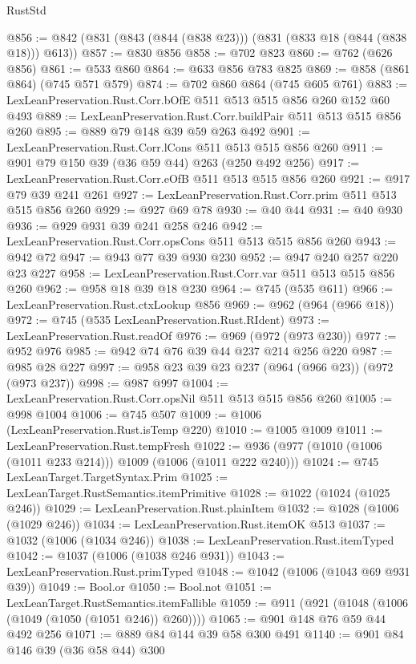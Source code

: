 \begin{lexlean}{RustStd}
\begin{coremodule}
@856 := @842 (@831 (@843 (@844 (@838 @23))) (@831 (@833 @18 (@844 (@838 @18))) @613))
@857 := @830 @856
@858 := @702 @823
@860 := @762 (@626 @856)
@861 := @533 @860
@864 := @633 @856 @783 @825
@869 := @858 (@861 @864) (@745 @571 @579)
@874 := @702 @860 @864 (@745 @605 @761)
@883 := LexLeanPreservation.Rust.Corr.bOfE @511 @513 @515 @856 @260 @152 @60 @493
@889 := LexLeanPreservation.Rust.Corr.buildPair @511 @513 @515 @856 @260
@895 := @889 @79 @148 @39 @59 @263 @492
@901 := LexLeanPreservation.Rust.Corr.lCons @511 @513 @515 @856 @260
@911 := @901 @79 @150 @39 (@36 @59 @44) @263 (@250 @492 @256)
@917 := LexLeanPreservation.Rust.Corr.eOfB @511 @513 @515 @856 @260
@921 := @917 @79 @39 @241 @261
@927 := LexLeanPreservation.Rust.Corr.prim @511 @513 @515 @856 @260
@929 := @927 @69 @78
@930 := @40 @44
@931 := @40 @930
@936 := @929 @931 @39 @241 @258 @246
@942 := LexLeanPreservation.Rust.Corr.opsCons @511 @513 @515 @856 @260
@943 := @942 @72
@947 := @943 @77 @39 @930 @230
@952 := @947 @240 @257 @220 @23 @227
@958 := LexLeanPreservation.Rust.Corr.var @511 @513 @515 @856 @260
@962 := @958 @18 @39 @18 @230
@964 := @745 (@535 @611)
@966 := LexLeanPreservation.Rust.ctxLookup @856
@969 := @962 (@964 (@966 @18))
@972 := @745 (@535 LexLeanPreservation.Rust.RIdent)
@973 := LexLeanPreservation.Rust.readOf
@976 := @969 (@972 (@973 @230))
@977 := @952 @976
@985 := @942 @74 @76 @39 @44 @237 @214 @256 @220
@987 := @985 @28 @227
@997 := @958 @23 @39 @23 @237 (@964 (@966 @23)) (@972 (@973 @237))
@998 := @987 @997
@1004 := LexLeanPreservation.Rust.Corr.opsNil @511 @513 @515 @856 @260
@1005 := @998 @1004
@1006 := @745 @507
@1009 := @1006 (LexLeanPreservation.Rust.isTemp @220)
@1010 := @1005 @1009
@1011 := LexLeanPreservation.Rust.tempFresh
@1022 := @936 (@977 (@1010 (@1006 (@1011 @233 @214))) @1009 (@1006 (@1011 @222 @240)))
@1024 := @745 LexLeanTarget.TargetSyntax.Prim
@1025 := LexLeanTarget.RustSemantics.itemPrimitive
@1028 := @1022 (@1024 (@1025 @246))
@1029 := LexLeanPreservation.Rust.plainItem
@1032 := @1028 (@1006 (@1029 @246))
@1034 := LexLeanPreservation.Rust.itemOK @513
@1037 := @1032 (@1006 (@1034 @246))
@1038 := LexLeanPreservation.Rust.itemTyped
@1042 := @1037 (@1006 (@1038 @246 @931))
@1043 := LexLeanPreservation.Rust.primTyped
@1048 := @1042 (@1006 (@1043 @69 @931 @39))
@1049 := Bool.or
@1050 := Bool.not
@1051 := LexLeanTarget.RustSemantics.itemFallible
@1059 := @911 (@921 (@1048 (@1006 (@1049 (@1050 (@1051 @246)) @260))))
@1065 := @901 @148 @76 @59 @44 @492 @256
@1071 := @889 @84 @144 @39 @58 @300 @491
@1140 := @901
    @84
    @146
    @39
    (@36 @58 @44)
    @300

\end{coremodule}
\end{lexlean}
